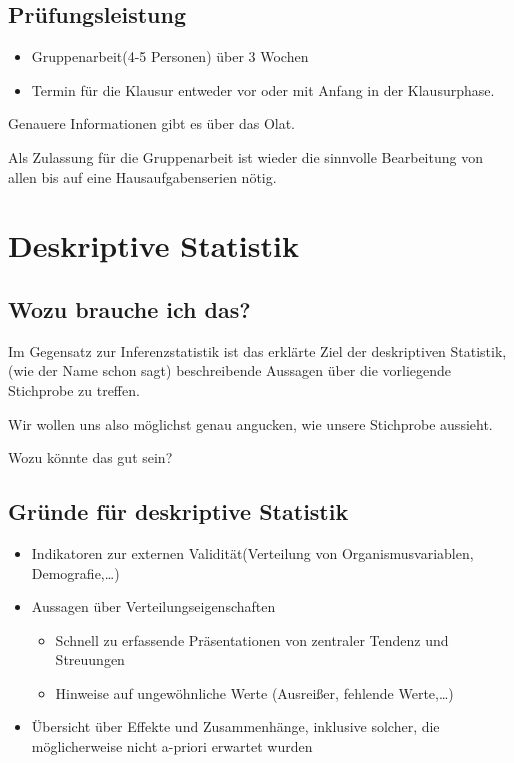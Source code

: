 \documentclass[
]{book}
\providecommand{\tightlist}{%
  \setlength{\itemsep}{0pt}\setlength{\parskip}{0pt}}
\begin{document}
\hypertarget{pruxfcfungsleistung-1}{%
\subsection{Prüfungsleistung}\label{pruxfcfungsleistung-1}}

\begin{itemize}
\item
  Gruppenarbeit(4-5 Personen) über 3 Wochen
\item
  Termin für die Klausur entweder vor oder mit Anfang in der Klausurphase.
\end{itemize}

Genauere Informationen gibt es über das Olat.

Als Zulassung für die Gruppenarbeit ist wieder die sinnvolle Bearbeitung von allen bis auf eine Hausaufgabenserien nötig.

\hypertarget{deskriptive-statistik}{%
\section{Deskriptive Statistik}\label{deskriptive-statistik}}

\hypertarget{wozu-brauche-ich-das}{%
\subsection{Wozu brauche ich das?}\label{wozu-brauche-ich-das}}

Im Gegensatz zur Inferenzstatistik ist das erklärte Ziel der deskriptiven Statistik, (wie der Name schon sagt) beschreibende Aussagen über die vorliegende Stichprobe zu treffen.

Wir wollen uns also möglichst genau angucken, wie unsere Stichprobe aussieht.

Wozu könnte das gut sein?

\hypertarget{gruxfcnde-fuxfcr-deskriptive-statistik}{%
\subsection{Gründe für deskriptive Statistik}\label{gruxfcnde-fuxfcr-deskriptive-statistik}}

\begin{itemize}
\item
  Indikatoren zur externen Validität(Verteilung von Organismusvariablen, Demografie,\ldots)
\item
  Aussagen über Verteilungseigenschaften

  \begin{itemize}
  \tightlist
  \item
    Schnell zu erfassende Präsentationen von zentraler Tendenz und Streuungen
  \item
    Hinweise auf ungewöhnliche Werte (Ausreißer, fehlende Werte,\ldots)
  \end{itemize}
\item
  Übersicht über Effekte und Zusammenhänge, inklusive solcher, die möglicherweise nicht a-priori erwartet wurden
\end{itemize}
\end{document}
